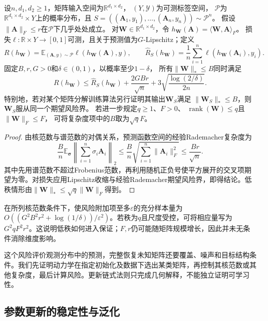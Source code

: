 \begin{theorem}[基于谱结构的矩阵预测期望风险]
\label{thm:nuclear-norm-generalization}
设$n,d_1,d_2\geq1$，矩阵输入空间为$\mathbb R^{d_1\times d_2}$，
$(Y,\mathcal Y)$为可测标签空间，
$\mathcal P$为$\mathbb R^{d_1\times d_2}\times Y$上的概率分布，且
$S=((\bm A_1,y_1),\ldots,(\bm A_n,y_n))\sim\mathcal P^n$。
假设$\|\bm A\|_F\leq r$在$\mathcal P$下几乎处处成立。
对$\bm W\in\mathbb R^{d_1\times d_2}$，令
$h_{\bm W}(\bm A)=\langle\bm W,\bm A\rangle_F$。
损失$\ell:\mathbb R\times Y\to[0,1]$可测，且关于预测值为$G$-Lipschitz；定义
\[
 R(h_{\bm W})=\mathbb E_{(\bm A,y)\sim\mathcal P}
                    \ell(h_{\bm W}(\bm A),y),\qquad
 \hat R_S(h_{\bm W})=\frac1n\sum_{i=1}^n
                    \ell(h_{\bm W}(\bm A_i),y_i).
\]
固定$B,r,G>0$和$\delta\in(0,1)$，以概率至少$1-\delta$，
所有$\|\bm W\|_*\leq B$同时满足
\[
 R(h_{\bm W})\leq\hat R_S(h_{\bm W})
       +\frac{2GBr}{\sqrt n}
       +3\sqrt{\frac{\log(2/\delta)}{2n}}.
\]
特别地，若对某个矩阵分解训练算法另行证明其输出$\bm W_S$满足
$\|\bm W_S\|_*\leq B$，则$\bm W_S$服从同一个期望风险界。
若进一步规定$q\geq1$、$F>0$、
$\operatorname{rank}(\bm W)\leq q$且$\|\bm W\|_F\leq F$，
可将复杂度项中的$B$取为$\sqrt qF$。
\end{theorem}
\begin{proof}
由核范数与谱范数的对偶关系，预测函数空间的经验Rademacher复杂度为
\[
 \frac Bn\mathbb E_{\bm\sigma}
       \left\|\sum_{i=1}^n\sigma_i\bm A_i\right\|_2
 \leq\frac Bn\sqrt{\sum_{i=1}^n\|\bm A_i\|_F^2}
 \leq\frac{Br}{\sqrt n}.
\]
其中先用谱范数不超过Frobenius范数，再利用随机正负号使平方展开的交叉项期望为零。对损失应用Lipschitz收缩与经验Rademacher期望风险界，即得结论。低秩情形由$\|\bm W\|_*\leq\sqrt q\|\bm W\|_F$得到。
\end{proof}

在所列核范数条件下，使风险附加项至多$\varepsilon$的充分样本量为$O((G^2B^2r^2+\log(1/\delta))/\varepsilon^2)$。若秩为$q$且尺度受控，可将相应量写为$G^2qF^2r^2$。这说明低秩如何进入保证；$F,r$仍可能随矩阵规模增长，因此并未无条件消除维度影响。

这个风险评价观测分布中的预测，完整恢复未知矩阵还要覆盖、噪声和目标结构条件。我们先证明动力学在指定初始化及数据下选出某类矩阵，再控制其核范数或其他复杂度，最后计算风险。更新链式法则只完成几何解释，不能独立证明可学习性。

\subsection{参数更新的稳定性与泛化}

